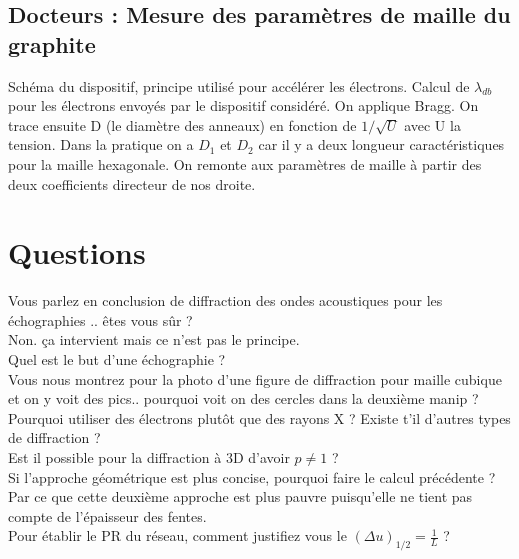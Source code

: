 \documentclass[12pt,prb,aps,epsf]{article}
\begin{document}
\subsection{Docteurs : Mesure des paramètres de maille du graphite}
Schéma du dispositif, principe utilisé pour accélérer les électrons. Calcul de $\lambda_{db}$ pour les électrons envoyés par le dispositif considéré. On applique Bragg. On trace ensuite D (le diamètre des anneaux) en fonction de $1/\sqrt{U}$ avec U la tension. Dans la pratique on a $D_1$ et $D_2$ car il y a deux longueur caractéristiques pour la maille hexagonale. On remonte aux paramètres de maille à partir des deux coefficients directeur de nos droite.

\section*{Questions}
Vous parlez en conclusion de diffraction des ondes acoustiques pour les échographies .. êtes vous sûr ?\\
Non. ça intervient mais ce n'est pas le principe.\\

Quel est le but d'une échographie ?\\

Vous nous montrez pour la photo d'une figure de diffraction pour maille cubique et on y voit des pics.. pourquoi voit on des cercles dans la deuxième manip ?\\

Pourquoi utiliser des électrons plutôt que des rayons X ? Existe t'il d'autres types de diffraction ?\\

Est il possible pour la diffraction à 3D d'avoir $p\neq 1$ ?\\

Si l'approche géométrique est plus concise, pourquoi faire le calcul précédente ?\\
Par ce que cette deuxième approche est plus pauvre puisqu'elle ne tient pas compte de l'épaisseur des fentes.\\

Pour établir le PR du réseau, comment justifiez vous le $(\Delta u)_{1/2} = \frac{1}{L}$ ?\\
\end{document}
